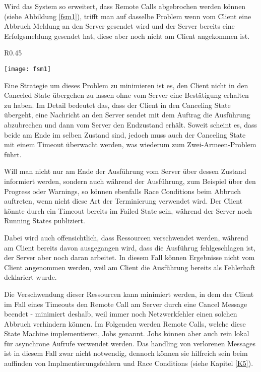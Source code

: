 Wird das System so erweitert, dass Remote Calls abgebrochen werden können (siehe Abbildung \ref{fsm1}), trifft man auf dasselbe Problem wenn vom Client eine Abbruch Meldung an den Server gesendet wird und der Server bereits eine Erfolgsmeldung gesendet hat, diese aber noch nicht am Client angekommen ist.
\begin{wrapfigure}{R}{0.45\textwidth}
  \vspace{-20pt}
  \begin{center}
    \texttt{[image: fsm1]}
  \end{center}
  \caption{Erweiterte State Machine eines abbrechbaren \rpc{}}
  \label{fsm1}
\end{wrapfigure}
Eine Strategie um dieses Problem zu minimieren ist es, den Client nicht in den Canceled State übergehen zu lassen ohne vom Server eine Bestätigung erhalten zu haben.
Im Detail bedeutet das, dass der Client in den Canceling State übergeht, eine Nachricht an den Server sendet mit dem Auftrag die Ausführung abzubrechen und dann vom Server den Endzustand erhält.
Soweit scheint es, dass beide am Ende im selben Zustand sind, jedoch muss auch der Canceling State mit einem Timeout überwacht werden, was wiederum zum Zwei-Armeen-Problem führt.

Will man nicht nur am Ende der Ausführung vom Server über dessen Zustand informiert werden, sondern auch während der Ausführung, zum Beispiel über den Progress oder Warnings, so können ebenfalls Race Conditions beim Abbruch auftreten, wenn nicht diese Art der Terminierung verwendet wird.
Der Client könnte durch ein Timeout bereits im Failed State sein, während der Server noch Running States publiziert.

Dabei wird auch offensichtlich, dass Ressourcen verschwendet werden,  während am Client bereits davon ausgegangen wird, dass die Ausführug fehlgeschlagen ist, der Server aber noch daran arbeitet.
In diesem Fall können Ergebnisse nicht vom Client angenommen werden, weil am Client die Ausführung bereits als Fehlerhaft deklariert wurde.

Die Verschwendung dieser Ressourcen kann minimiert werden, in dem der Client im Fall eines Timeouts den Remote Call am Server durch eine Cancel Message beendet
- minimiert deshalb, weil immer noch Netzwerkfehler einen solchen Abbruch verhindern können.
Im Folgenden werden Remote Calls, welche diese State Machine implementieren, Jobs genannt.
Jobs können aber auch rein lokal für asynchrone Aufrufe verwendet werden.
Das handling von verlorenen Messages ist in diesem Fall zwar nicht notwendig, dennoch können sie hilfreich sein beim auffinden von Implmentierungsfehlern und Race Conditions (siehe Kapitel \ref{K5}).





